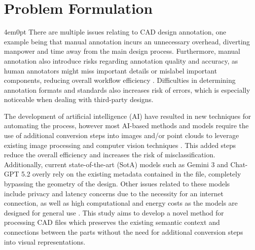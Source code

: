 \section{Problem Formulation}
	\begin{indentedblock}{4em}{0pt}
		There are multiple issues relating to CAD design annotation, one example being that manual annotation incurs an unnecessary overhead, diverting manpower and time away from the main design process. Furthermore, manual annotation also introduce risks regarding annotation quality and accuracy, as human annotators might miss important details or mislabel important components, reducing overall workflow efficiency \parencite{gnn_mandelli}. Difficulties in determining annotation formats and standards also increases risk of errors, which is especially noticeable when dealing with third-party designs.
		 
		
		The development of artificial intelligence (AI) have resulted in new techniques for automating the process, however most AI-based methods and models require the use of additional conversion steps into images and/or point clouds to leverage existing image processing and computer vision techniques \parencite{gnn_mandelli}. This added steps reduce the overall efficiency and increases the risk of misclassification. Additionally, current state-of-the-art (SotA) models such as Gemini 3 and Chat-GPT 5.2 overly rely on the existing metadata contained in the file, completely bypassing the geometry of the design. Other issues related to these models include privacy and latency concerns due to the necessity for an internet connection, as well as high computational and energy costs as the models are designed for general use \parencite{llm_energy_usage_odonnell}. This study aims to develop a novel method for processing CAD files which preserves the existing semantic context and connections between the parts without the need for additional conversion steps into visual representations.
		
	\end{indentedblock}

